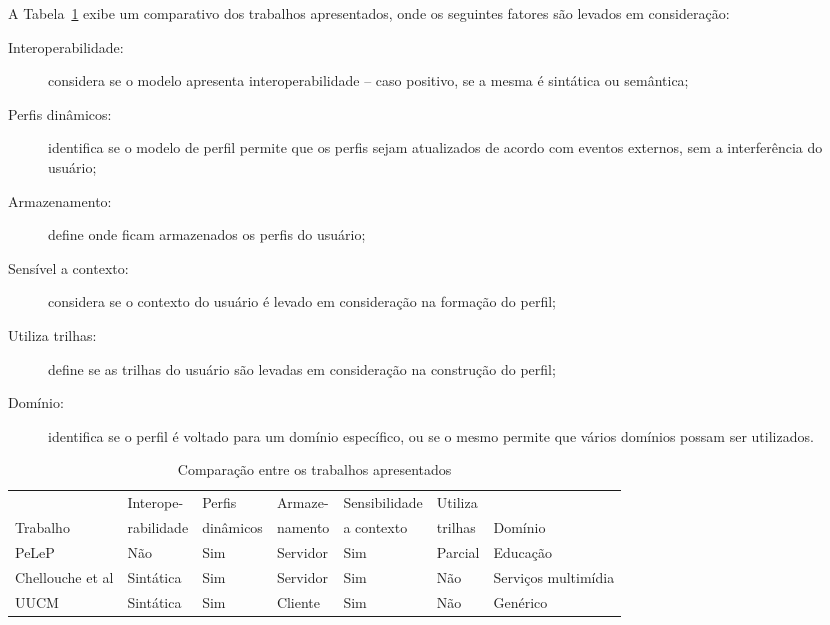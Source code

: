 A Tabela~\ref{tab:comparacao} exibe um comparativo dos trabalhos apresentados, onde os seguintes fatores são levados em consideração:


\begin{description}
  \item[Interoperabilidade:] considera se o modelo apresenta interoperabilidade -- caso positivo, se a mesma é sintática ou semântica;
  \item[Perfis dinâmicos:] identifica se o modelo de perfil permite que os perfis sejam atualizados de acordo com eventos externos, sem a interferência do usuário;
  \item[Armazenamento:] define onde ficam armazenados os perfis do usuário;
  \item[Sensível a contexto:] considera se o contexto do usuário é levado em consideração na formação do perfil;
  \item[Utiliza trilhas:] define se as trilhas do usuário são levadas em consideração na construção do perfil;
  \item[Domínio:] identifica se o perfil é voltado para um domínio específico, ou se o mesmo permite que vários domínios possam ser utilizados.
\end{description}

\begin{table}\centering\footnotesize
  \begin{tabular*}{1\textwidth}{@{}lllllll@{}}
    \toprule
                                         & Interope-  & Perfis    & Armaze-  & Sensibilidade & Utiliza & \\
    Trabalho                             & rabilidade & dinâmicos & namento  & a contexto    & trilhas & Domínio \\
    \midrule
    PeLeP \cite{pelep}                   & Não        & Sim       & Servidor & Sim           & Parcial & Educação \\
    Chellouche et al \cite{chellouche10} & Sintática  & Sim       & Servidor & Sim           & Não     & Serviços multimídia \\
    UUCM \cite{niederee04}               & Sintática  & Sim       & Cliente  & Sim           & Não     & Genérico \\
    \bottomrule
  \end{tabular*}
  \caption{Comparação entre os trabalhos apresentados}
  \label{tab:comparacao}
\end{table}
